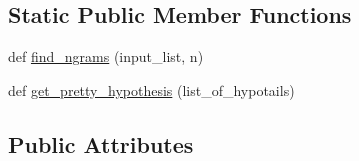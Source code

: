 \subsection*{Static Public Member Functions}
\begin{DoxyCompactItemize}
\item 
def \hyperlink{classcontrollable__seq2seq_1_1controllable__seq2seq_1_1Beam_a9c213fba3652f8490b9f80be89c9d7fc}{find\+\_\+ngrams} (input\+\_\+list, n)
\item 
def \hyperlink{classcontrollable__seq2seq_1_1controllable__seq2seq_1_1Beam_aa374348209046f9b74218729202f29ba}{get\+\_\+pretty\+\_\+hypothesis} (list\+\_\+of\+\_\+hypotails)
\end{DoxyCompactItemize}
\subsection*{Public Attributes}
